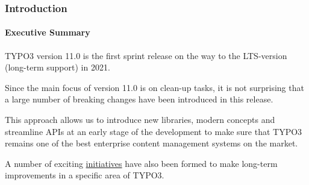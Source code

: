 
\begin{frame}[fragile]
	\frametitle{Introduction}
	\framesubtitle{Executive Summary}

	\small
		TYPO3 version 11.0 is the first sprint release on the way to the LTS-version
		(long-term support) in 2021.

		\vspace{0.2cm}

		Since the main focus of version 11.0 is on clean-up tasks, it is not surprising
		that a large number of breaking changes have been introduced in this release.

		\vspace{0.2cm}

		This approach allows us to introduce new libraries, modern concepts and
		streamline APIs at an early stage of the development to make sure that TYPO3
		remains one of the best enterprise content management systems on the market.

		\vspace{0.2cm}

		A number of exciting
		\href{https://typo3.org/community/teams/typo3-development/initiatives/}{initiatives}
		have also been formed to make long-term improvements in a specific area of
		TYPO3.
	\normalsize

\end{frame}

